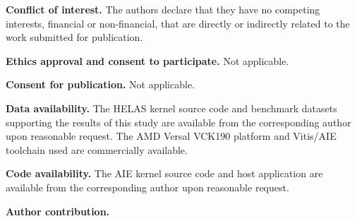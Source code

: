 \noindent\textbf{Conflict of interest.}
The authors declare that they have no competing interests, financial or
non-financial, that are directly or indirectly related to the work submitted
for publication.

\noindent\textbf{Ethics approval and consent to participate.}
Not applicable.

\noindent\textbf{Consent for publication.}
Not applicable.

\noindent\textbf{Data availability.}
The HELAS kernel source code and benchmark datasets supporting the results
of this study are available from the corresponding author upon reasonable
request.  The AMD Versal VCK190 platform and Vitis/AIE toolchain used are
commercially available.

\noindent\textbf{Code availability.}
The AIE kernel source code and host application are available from the
corresponding author upon reasonable request.

\noindent\textbf{Author contribution.}

